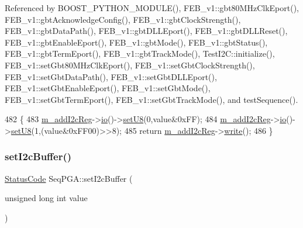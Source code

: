 Referenced by B\+O\+O\+S\+T\+\_\+\+P\+Y\+T\+H\+O\+N\+\_\+\+M\+O\+D\+U\+L\+E(), F\+E\+B\+\_\+v1\+::gbt80\+M\+Hz\+Clk\+Eport(), F\+E\+B\+\_\+v1\+::gbt\+Acknowledge\+Config(), F\+E\+B\+\_\+v1\+::gbt\+Clock\+Strength(), F\+E\+B\+\_\+v1\+::gbt\+Data\+Path(), F\+E\+B\+\_\+v1\+::gbt\+D\+L\+L\+Eport(), F\+E\+B\+\_\+v1\+::gbt\+D\+L\+L\+Reset(), F\+E\+B\+\_\+v1\+::gbt\+Enable\+Eport(), F\+E\+B\+\_\+v1\+::gbt\+Mode(), F\+E\+B\+\_\+v1\+::gbt\+Status(), F\+E\+B\+\_\+v1\+::gbt\+Term\+Eport(), F\+E\+B\+\_\+v1\+::gbt\+Track\+Mode(), Test\+I2\+C\+::initialize(), F\+E\+B\+\_\+v1\+::set\+Gbt80\+M\+Hz\+Clk\+Eport(), F\+E\+B\+\_\+v1\+::set\+Gbt\+Clock\+Strength(), F\+E\+B\+\_\+v1\+::set\+Gbt\+Data\+Path(), F\+E\+B\+\_\+v1\+::set\+Gbt\+D\+L\+L\+Eport(), F\+E\+B\+\_\+v1\+::set\+Gbt\+Enable\+Eport(), F\+E\+B\+\_\+v1\+::set\+Gbt\+Mode(), F\+E\+B\+\_\+v1\+::set\+Gbt\+Term\+Eport(), F\+E\+B\+\_\+v1\+::set\+Gbt\+Track\+Mode(), and test\+Sequence().


\begin{DoxyCode}
482                                                      \{
483   \hyperlink{classSeqPGA_ac3a6aad3fec65ceb78528b6d20deeb3f}{m\_addI2cReg}->\hyperlink{classIOobject_af04fb94137c3d86849f478ac5afab5d1}{io}()->\hyperlink{classIOdata_a6c4fb2f2af01889ada889c2b7aceb24d}{setU8}(0,value&0xFF);
484   \hyperlink{classSeqPGA_ac3a6aad3fec65ceb78528b6d20deeb3f}{m\_addI2cReg}->\hyperlink{classIOobject_af04fb94137c3d86849f478ac5afab5d1}{io}()->\hyperlink{classIOdata_a6c4fb2f2af01889ada889c2b7aceb24d}{setU8}(1,(value&0xFF00)>>8);
485   \textcolor{keywordflow}{return} \hyperlink{classSeqPGA_ac3a6aad3fec65ceb78528b6d20deeb3f}{m\_addI2cReg}->\hyperlink{classIOobject_a9f6984bc9f0fadcf800f1be2523ac744}{write}();
486 \}
\end{DoxyCode}
\mbox{\label{classSeqPGA_ab93beca49a31c1f9fddc915e9efeeaa0}} 
\subsubsection{\texorpdfstring{set\+I2c\+Buffer()}{setI2cBuffer()}}
{\footnotesize\ttfamily \hyperlink{classStatusCode}{Status\+Code} Seq\+P\+G\+A\+::set\+I2c\+Buffer (\begin{DoxyParamCaption}\item[{unsigned long int}]{value }\end{DoxyParamCaption})}



